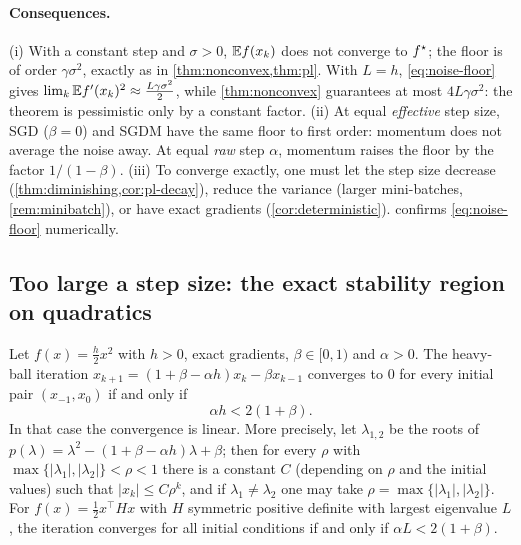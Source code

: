 \paragraph{Consequences.}
(i) With a constant step and $\sigma>0$, $\mathbb{E} f(x_k)$ does not converge to $f^\star$; the floor is
of order $\gamma\sigma^2$, exactly as in \cref{thm:nonconvex,thm:pl}. With $L=h$,
\eqref{eq:noise-floor} gives $\lim_k\mathbb{E} f'(x_k)^2\approx\frac{L\gamma\sigma^2}{2}$, while
\cref{thm:nonconvex} guarantees at most $4L\gamma\sigma^2$: the theorem is pessimistic only by
a constant factor. (ii) At equal \emph{effective} step size, SGD ($\beta=0$) and SGDM have the
same floor to first order: momentum does not average the noise away. At equal \emph{raw}
step $\alpha$, momentum raises the floor by the factor $1/(1-\beta)$. (iii) To converge
exactly, one must let the step size decrease (\cref{thm:diminishing,cor:pl-decay}), reduce
the variance (larger mini-batches, \cref{rem:minibatch}), or have exact gradients
(\cref{cor:deterministic}).  confirms \eqref{eq:noise-floor}
numerically.

\subsection{Too large a step size: the exact stability region on quadratics}

\begin{proposition}\label{prop:quadratic-stability}
Let $f(x)=\frac h2x^2$ with $h>0$, exact gradients, $\beta\in[0,1)$ and $\alpha>0$. The
heavy-ball iteration $x_{k+1}=(1+\beta-\alpha h)x_k-\beta x_{k-1}$ converges to $0$ for
every initial pair $(x_{-1},x_0)$ if and only if
\begin{equation}\label{eq:stability}
  \alpha h<2(1+\beta).
\end{equation}
In that case the convergence is linear. More precisely, let $\lambda_{1,2}$ be the roots of
$p(\lambda)=\lambda^2-(1+\beta-\alpha h)\lambda+\beta$; then for every $\rho$ with
$\max\{|\lambda_1|,|\lambda_2|\}<\rho<1$ there is a constant $C$ (depending on $\rho$ and the
initial values) such that $|x_k|\le C\rho^k$, and if $\lambda_1\ne\lambda_2$ one may take
$\rho=\max\{|\lambda_1|,|\lambda_2|\}$.
For $f(x)=\frac12x^\top Hx$ with $H$ symmetric positive definite with largest eigenvalue
$L$, the iteration converges for all initial conditions if and only if $\alpha L<2(1+\beta)$.
\end{proposition}

